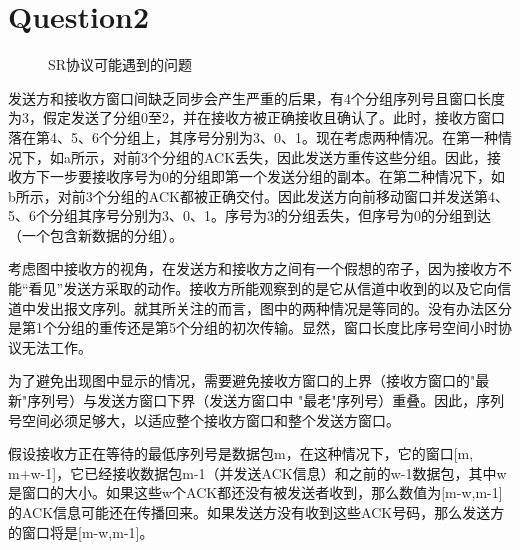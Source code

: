 \documentclass[UTF8]{article}
\begin{document}
\section*{Question2}
\begin{figure}[ht]
    \centering  %
    \caption{SR协议可能遇到的问题}
\end{figure}
发送方和接收方窗口间缺乏同步会产生严重的后果，有4个分组序列号且窗口长度为3，假定发送了分组0至2，并在接收方被正确接收且确认了。此时，接收方窗口落在第4、5、6个分组上，其序号分别为3、0、1。现在考虑两种情况。在第一种情况下，如a所示，对前3个分组的ACK丢失，因此发送方重传这些分组。因此，接收方下一步要接收序号为0的分组即第一个发送分组的副本。在第二种情况下，如b所示，对前3个分组的ACK都被正确交付。因此发送方向前移动窗口并发送第4、5、6个分组其序号分别为3、0、1。序号为3的分组丢失，但序号为0的分组到达（一个包含新数据的分组）。

考虑图中接收方的视角，在发送方和接收方之间有一个假想的帘子，因为接收方不能“看见”发送方采取的动作。接收方所能观察到的是它从信道中收到的以及它向信道中发出报文序列。就其所关注的而言，图中的两种情况是等同的。没有办法区分是第1个分组的重传还是第5个分组的初次传输。显然，窗口长度比序号空间小时协议无法工作。

为了避免出现图中显示的情况，需要避免接收方窗口的上界（接收方窗口的"最新"序列号）与发送方窗口下界（发送方窗口中 "最老"序列号）重叠。因此，序列号空间必须足够大，以适应整个接收方窗口和整个发送方窗口。

假设接收方正在等待的最低序列号是数据包m，在这种情况下，它的窗口[m, m+w-1]，它已经接收数据包m-1（并发送ACK信息）和之前的w-1数据包，其中w是窗口的大小。如果这些w个ACK都还没有被发送者收到，那么数值为[m-w,m-1]的ACK信息可能还在传播回来。如果发送方没有收到这些ACK号码，那么发送方的窗口将是[m-w,m-1]。
\end{document}
